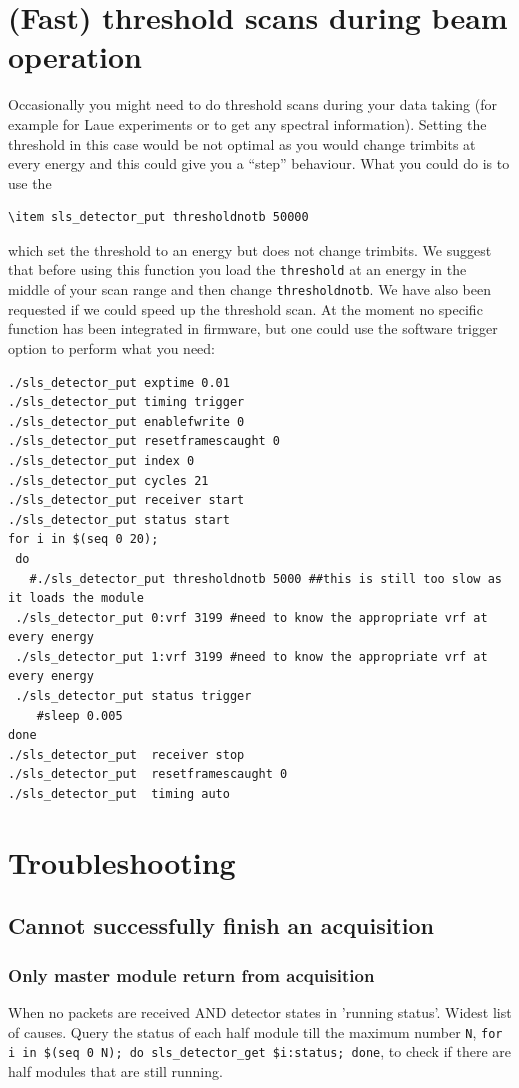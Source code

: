 \documentclass{article}
\begin{document}
\section{(Fast) threshold scans during beam operation}\label{sec:fastthresholdscan}
Occasionally you might need to do threshold scans during your data taking (for example for Laue experiments or to get any spectral information). Setting the threshold in this case would be not optimal as you would change trimbits at every energy and this could give you a ``step'' behaviour. What you could do is to use the 
\begin{verbatim}
\item sls_detector_put thresholdnotb 50000 
\end{verbatim}
 which set the threshold to an energy but does not change trimbits. We suggest that before using this function you load the {\tt{threshold}} at an energy in the middle of your scan range and then change {\tt{thresholdnotb}}.
We have also been requested if we could speed up the threshold scan. At the moment no specific function has been integrated in firmware, but one could use the software trigger option to perform what you need:
\begin{verbatim}
./sls_detector_put exptime 0.01
./sls_detector_put timing trigger
./sls_detector_put enablefwrite 0
./sls_detector_put resetframescaught 0 
./sls_detector_put index 0
./sls_detector_put cycles 21
./sls_detector_put receiver start
./sls_detector_put status start 
for i in $(seq 0 20); 
 do
   #./sls_detector_put thresholdnotb 5000 ##this is still too slow as it loads the module 
 ./sls_detector_put 0:vrf 3199 #need to know the appropriate vrf at every energy 
 ./sls_detector_put 1:vrf 3199 #need to know the appropriate vrf at every energy 
 ./sls_detector_put status trigger
    #sleep 0.005
done
./sls_detector_put  receiver stop
./sls_detector_put  resetframescaught 0 
./sls_detector_put  timing auto
\end{verbatim} 

\section{Troubleshooting}
\subsection{Cannot successfully finish an acquisition}
\subsubsection{Only master module return from acquisition}
When no packets are received AND detector states in 'running status'. Widest list of causes. 
Query the status of each half module till the maximum number {\tt{N}},  {\tt{for i in \$(seq\ 0\ N); do sls\_detector\_get \$i:status; done}}, to check if there are half modules that are still running.
\end{document}
